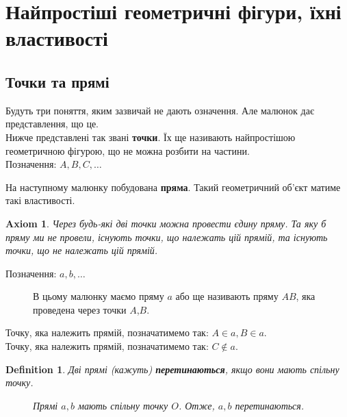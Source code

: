 \documentclass[a4paper, 10pt]{article}
\theoremstyle{theoremdd}
\theoremstyle{theoremdd}
\newtheorem{axiom}{Axiom}
\theoremstyle{theoremdd}
\newtheorem{definition}[theorem]{Definition}
\theoremstyle{theoremdd}
\theoremstyle{theoremdd}
\theoremstyle{theoremdd}
\theoremstyle{theoremdd}
\theoremstyle{theoremdd}
\theoremstyle{theoremdd}
\begin{document}
\tableofcontents
\newpage

\section{Найпростіші геометричні фігури, їхні властивості}
\subsection{Точки та прямі}
Будуть три поняття, яким зазвичай не дають означення. Але малюнок дає представлення, що це.\\
Нижче представлені так звані \textbf{точки}. Їх ще називають найпростішою геометричною фігурою, що не можна розбити на частини.\\
Позначення: $A,B,C,\dots$
\begin{figure}[H]
\centering
{}
\end{figure}

На наступному малюнку побудована \textbf{пряма}. Такий геометричний об'єкт матиме такі властивості.
\begin{axiom}
Через будь-які дві точки можна провести єдину пряму. Та яку б пряму ми не провели, існують точки, що належать цій прямій, та існують точки, що не належать цій прямій.
\end{axiom}
Позначення: $a,b,\dots$
\begin{figure}[H]
\centering
{}
\caption*{В цьому малюнку маємо пряму $a$ або ще називають пряму $AB$, яка проведена через точки $A$,$B$.}
\end{figure}
Точку, яка належить прямій, позначатимемо так: $A \in a, B \in a$. \\
Точку, яка належить прямій, позначатимемо так: $C \notin a$.

\begin{definition}
Дві прямі (кажуть) \textbf{перетинаються}, якщо вони мають спільну точку.
\begin{figure}[H]
\centering
{}
\caption*{Прямі $a,b$ мають спільну точку $O$. Отже, $a,b$ перетинаються.}
\end{figure}
\end{definition}
\end{document}
